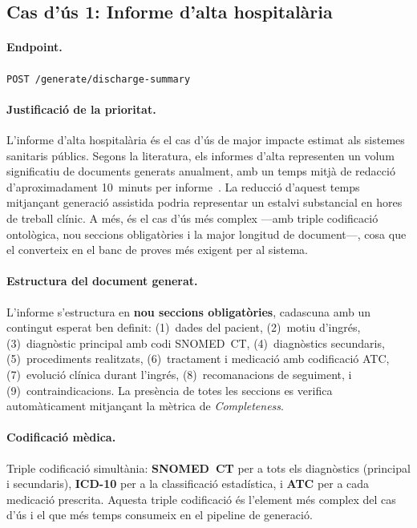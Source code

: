 \documentclass[CAT]{TFUOC}%
\begin{document}
\subsection{Cas d'ús 1: Informe d'alta hospitalària}

\paragraph{Endpoint.} \texttt{POST /generate/discharge-summary}

\paragraph{Justificació de la prioritat.} L'informe d'alta hospitalària és el cas d'ús de major impacte estimat als sistemes sanitaris públics. Segons la literatura, els informes d'alta representen un volum significatiu de documents generats anualment, amb un temps mitjà de redacció d'aproximadament 10~minuts per informe~\cite{chua2024discharge}. La reducció d'aquest temps mitjançant generació assistida podria representar un estalvi substancial en hores de treball clínic. A més, és el cas d'ús més complex ---amb triple codificació ontològica, nou seccions obligatòries i la major longitud de document---, cosa que el converteix en el banc de proves més exigent per al sistema.

\paragraph{Estructura del document generat.} L'informe s'estructura en \textbf{nou seccions obligatòries}, cadascuna amb un contingut esperat ben definit: (1)~dades del pacient, (2)~motiu d'ingrés, (3)~diagnòstic principal amb codi SNOMED~CT, (4)~diagnòstics secundaris, (5)~procediments realitzats, (6)~tractament i medicació amb codificació ATC, (7)~evolució clínica durant l'ingrés, (8)~recomanacions de seguiment, i (9)~contraindicacions. La presència de totes les seccions es verifica automàticament mitjançant la mètrica de \textit{Completeness}.

\paragraph{Codificació mèdica.} Triple codificació simultània: \textbf{SNOMED~CT} per a tots els diagnòstics (principal i secundaris), \textbf{ICD-10} per a la classificació estadística, i \textbf{ATC} per a cada medicació prescrita. Aquesta triple codificació és l'element més complex del cas d'ús i el que més temps consumeix en el pipeline de generació.
\end{document}

